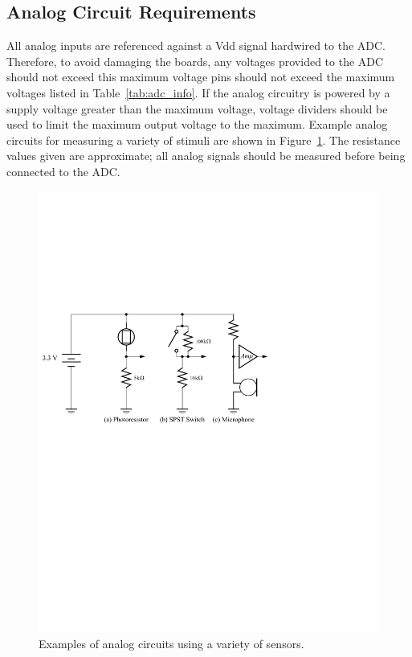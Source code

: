 \documentclass[11pt, twoside, pdftex]{article}
\begin{document}
\subsection{Analog Circuit Requirements}
All analog inputs are referenced against a {\sf Vdd} signal hardwired to the ADC. Therefore, to avoid damaging the boards, any voltages provided to the ADC
should not exceed this maximum voltage pins should not exceed the maximum voltages listed in 
Table~\ref{tab:adc_info}. If the analog circuitry is powered by a supply voltage greater than the maximum voltage, voltage dividers should be used to limit the
maximum output voltage to the maximum. Example analog circuits for measuring a variety of stimuli are shown in Figure~\ref{fig:analog_examples}. The resistance 
values given are approximate; all analog signals should be measured before being connected to the ADC.

\begin{figure} [H]
\begin {center}
\includegraphics[scale=0.80]{figures/analog_examples.pdf}
\end{center}
\caption{Examples of analog circuits using a variety of sensors.}
\label{fig:analog_examples}
\end{figure}
\end{document}
